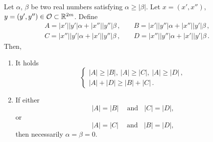 \begin{lemma}
\label{Lemma:ComputationABCD} Let $\alpha$, $\beta$ be two real numbers satisfying $\alpha \geq
|\beta|$. Let $x=(x',x'')$, $y=(y',y'')\in \mathcal{O} \subset \mathbb{R}^{2m}$. Define
$$
\begin{array}{cc}
	A = |x'||y'|  \alpha + |x''||y''|\beta \,, \ \ \ \ \ &
	B = |x'||y''| \alpha + |x''||y'| \beta \,, \\
	C = |x''||y'| \alpha + |x'||y''| \beta \,, \ \ \ \ \ &
	D = |x''||y''|\alpha + |x'||y'|  \beta \,.
\end{array}
$$
Then,
\begin{enumerate}
\item It holds
$$
\begin{cases}
|A| \geq |B|,\ |A| \geq|C|, \ |A| \geq|D|\,, \\
|A| + |D| \geq |B| + |C|\,.
\end{cases}
$$
\item If either
$$ |A| = |B| \ \ \ \ \textrm{ and} \ \ \ \ |C| = |D|, $$
or
$$ |A| = |C| \ \ \ \ \textrm{ and} \ \ \ \ |B| = |D|, $$
then necessarily $\alpha = \beta = 0$.
\end{enumerate}

\end{lemma}
